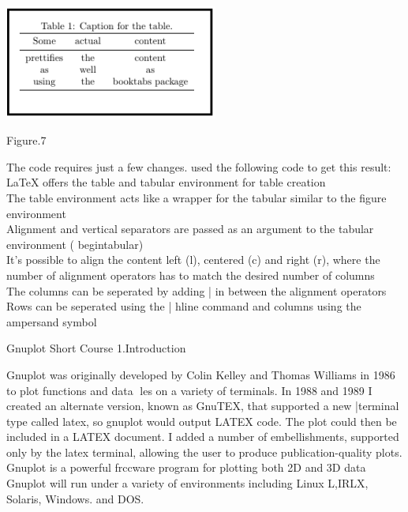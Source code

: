 \documentclass[onecolumn,journal] {IEEEtran}
\begin{document}
 \center
\includegraphics[width=7cm]{distable1.png}
\begin{center}
\end{center} 
\begin{center}
Figure.7
\end{center}
\begin{flushleft}
The code requires just a few changes.  used the following code to get this result:\\
LaTeX offers the table and tabular environment for table creation\\
The table environment acts like a wrapper for the tabular similar to the figure environment\\
Alignment and vertical separators are passed as an argument to the tabular   environment  ( begin{tabular})\\
It's possible to align the content left (l), centered (c) and right (r), where the number of alignment operators has to match the desired number of columns \\
The columns can be seperated by adding | in between the alignment operators\\
Rows can be seperated using the | hline command and columns using the ampersand   symbol 
\newline
\newline
\begin{Large}
 Gnuplot Short Course 
\newline
\newline
1.Introduction \\
\end{Large}
Gnuplot was originally developed by Colin Kelley and Thomas Williams in 1986 to plot functions and data
les on a variety of terminals. In 1988 and 1989 I created an alternate version, known as GnuTEX, that
supported a new |terminal type called latex, so gnuplot would output LATEX code. The plot could then be
included in a LATEX document. I added a number of embellishments, supported only by the latex terminal,
allowing the user to produce publication-quality plots.\\
Gnuplot is a powerful frccware program for plotting both 2D and 3D data Gnuplot will run under a variety of environments including Linux L,IRLX, Solaris, Windows. and DOS.\\

\end{flushleft}
\end{document}
